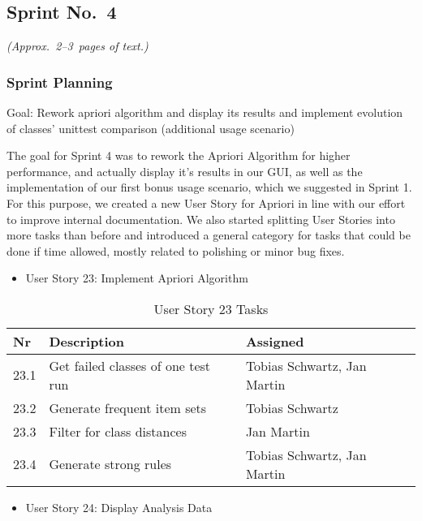 
\subsection{Sprint No.~4}

\emph{(Approx.~2--3~pages of text.)}

\subsubsection*{Sprint Planning}

Goal: Rework apriori algorithm and display its results and implement evolution of classes' unittest comparison (additional usage scenario)

The goal for Sprint 4 was to rework the Apriori Algorithm for higher performance, and actually display it's results in our GUI, as well as the implementation of our first bonus usage scenario, which we suggested in Sprint 1. 
For this purpose, we created a new User Story for Apriori in line with our effort to improve internal documentation.
We also started splitting User Stories into more tasks than before and introduced a general category for tasks that could be done if time allowed, mostly related to polishing or minor bug fixes.

\begin{itemize}
	\item User Story 23: Implement Apriori Algorithm
	\end{itemize}

\begin{table}[h]
  \caption{User Story 23 Tasks}
  \label{Story 23 Tasks}
  \centering
  \begin{tabular}{p{1cm}|p{5cm}|p{3cm}|}
  	Nr & Description & Assigned \\ 
  	\hline
  	23.1 & Get failed classes of one test run & Tobias Schwartz, Jan Martin \\ 
  	\hline
  	23.2 & Generate frequent item sets & Tobias Schwartz \\ 
  	\hline
  	23.3 & Filter for class distances & Jan Martin \\ 
  	\hline
  	23.4 & Generate strong rules & Tobias Schwartz, Jan Martin \\ 
  	\hline
  \end{tabular}
\end{table}

\begin{itemize}
	\item User Story 24: Display Analysis Data
	\end{itemize}

